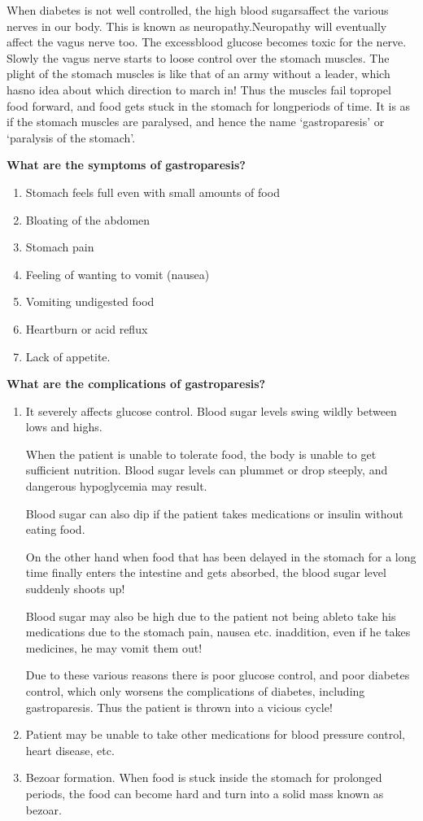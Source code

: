 When diabetes is not well controlled, the high blood sugars\break affect the various nerves in our body. This is known as neuropathy.\break Neuropathy will eventually affect the vagus nerve too. The excess\break blood glucose becomes toxic for the nerve. Slowly the vagus nerve starts to loose control over the stomach muscles. The plight of the stomach muscles is like that of an army without a leader, which has\break no idea about which direction to march in! Thus the muscles fail to\break propel food forward, and food gets stuck in the stomach for long\break periods of time. It is as if the stomach muscles are paralysed, and hence the name ‘gastroparesis’ or ‘paralysis of the stomach’.

\noindent\textbf{What are the symptoms of gastroparesis?}
\begin{enumerate}[•]
\itemsep=0pt
\item Stomach feels full even with small amounts of food
\item Bloating of the abdomen
\item Stomach pain
\item Feeling of wanting to vomit (nausea)
\item Vomiting undigested food
\item Heartburn or acid reflux
\item Lack of appetite.
\end{enumerate}

\noindent\textbf{What are the complications of gastroparesis?}

\begin{enumerate}[\ding{118}] 
\itemsep=0pt
\item It severely affects glucose control. Blood sugar levels swing wildly between lows and highs.

When the patient is unable to tolerate food, the body is unable to get sufficient nutrition. Blood sugar levels can plummet or drop steeply, and dangerous hypoglycemia may result.

Blood sugar can also dip if the patient takes medications or insulin without eating food.

On the other hand when food that has been delayed in the stomach for a long time finally enters the intestine and gets absorbed, the blood sugar level suddenly shoots up!

Blood sugar may also be high due to the patient not being able\break to take his medications due to the stomach pain, nausea etc. in\break addition, even if he takes medicines, he may vomit them out!

Due to these various reasons there is poor glucose control, and poor diabetes control, which only worsens the complications of diabetes, including gastroparesis. Thus the patient is thrown into a vicious cycle!
\item Patient may be unable to take other medications for blood pressure control, heart disease, etc.
\item Bezoar formation. When food is stuck inside the stomach for prolonged periods, the food can become hard and turn into a solid mass known as bezoar.
\end{enumerate}


